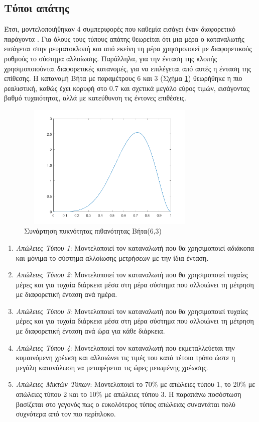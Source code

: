 \subsection{Τύποι απάτης}
Έτσι, μοντελοποιήθηκαν 4 συμπεριφορές που καθεμία εισάγει έναν διαφορετικό παράγοντα \cite{conspatterns}. Για όλους τους τύπους απάτης θεωρείται ότι μια μέρα ο καταναλωτής εισάγεται στην ρευματοκλοπή και από εκείνη τη μέρα χρησιμοποιεί με διαφορετικούς ρυθμούς το σύστημα αλλοίωσης. Παράλληλα, για την ένταση της κλοπής χρησιμοποιούνται διαφορετικές κατανομές, για να επιλέγεται από αυτές η ένταση της επίθεσης. Η κατανομή Βήτα με παραμέτρους 6 και 3 (Σχήμα \ref{beta63}) θεωρήθηκε η πιο ρεαλιστική, καθώς έχει κορυφή στο 0.7 και σχετικά μεγάλο εύρος τιμών, εισάγοντας βαθμό τυχαιότητας, αλλά με κατεύθυνση τις έντονες επιθέσεις.\par
\begin{figure}[ht!]
\centering
\includegraphics[width=90mm, height=60mm]{../../plots/Consumption_Analysis/beta_6_3.png}
\caption{Συνάρτηση πυκνότητας πιθανότητας Βήτα(6,3) \label{beta63}}
\end{figure}
\begin{enumerate}
\item \textit{Απώλειες Τύπου 1}: Μοντελοποιεί τον καταναλωτή που θα χρησιμοποιεί αδιάκοπα και μόνιμα το σύστημα αλλοίωσης μετρήσεων με την ίδια ένταση.
\item \textit{Απώλειες Τύπου 2}: Μοντελοποιεί τον καταναλωτή που θα χρησιμοποιεί τυχαίες μέρες και για τυχαία διάρκεια μέσα στη μέρα σύστημα που αλλοιώνει τη μέτρηση με διαφορετική ένταση ανά ημέρα.
\item \textit{Απώλειες Τύπου 3}: Μοντελοποιεί τον καταναλωτή που θα χρησιμοποιεί τυχαίες μέρες και για τυχαία διάρκεια μέσα στη μέρα σύστημα που αλλοιώνει τη μέτρηση με διαφορετική ένταση ανά ώρα για κάθε διάρκεια.
\item \textit{Απώλειες Τύπου 4}: Μοντελοποιεί τον καταναλωτή που εκμεταλλεύεται την κυμαινόμενη χρέωση και αλλοιώνει τις τιμές του κατά τέτοιο τρόπο ώστε η μεγάλη κατανάλωση να μεταφέρεται τις ώρες μειωμένης χρέωσης.
\item \textit{Απώλειες Μικτών Τύπων}: Μοντελοποιεί το 70\% με απώλειες τύπου 1, το 20\% με απώλειες τύπου 2 και το 10\% με απώλειες τύπου 3. Η παραπάνω ποσόστωση βασίζεται στο γεγονός πως ο ευκολότερος τύπος απώλειας συναντάται πολύ συχνότερα από τον πιο περίπλοκο. 
\end{enumerate}

